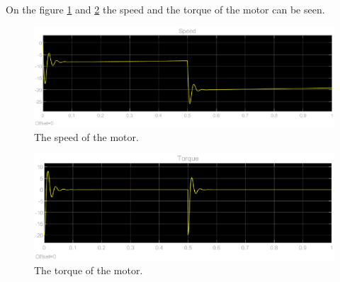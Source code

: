 On the figure \ref{fig:speed} and \ref{fig:torque} the speed and the torque of the motor can be seen.

\begin{figure}[H]
	\centering
	\includegraphics[width=0.9\linewidth]{pictures/control/speed.eps}
	\caption{The speed of the motor.}
	\label{fig:speed}
\end{figure}

\begin{figure}[H]
	\centering
	\includegraphics[width=0.9\linewidth]{pictures/control/torque.eps}
	\caption{The torque of the motor.}
	\label{fig:torque}
\end{figure}


